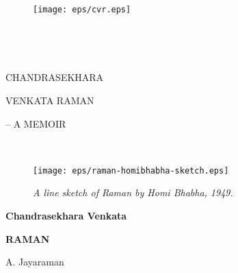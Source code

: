 ~\phantom{-}
\vfill

\thispagestyle{empty}

\begin{figure}[H]
\centering
\texttt{[image: eps/cvr.eps]}
\end{figure}

\vfill\eject

~\phantom{a}
\vfill

\thispagestyle{empty}

\vfill\eject


~\phantom{a}
\vfill

{
\thispagestyle{empty}

\begin{center}
{\LARGE\sf CHANDRASEKHARA}
\bigskip

{\LARGE\sf VENKATA RAMAN}

\bigskip
{\Large\sf -- A MEMOIR}
\end{center}

\vfill\eject

~\phantom{-}
\vfill

\thispagestyle{empty}

\begin{figure}[H]
\centering
\texttt{[image: eps/raman-homibhabha-sketch.eps]}

\medskip
{\fontsize{10pt}{12pt}\selectfont\em A line sketch of Raman by Homi Bhabha, 1949.}\relax
\end{figure}

\vfill\eject


\thispagestyle{empty}

\begin{center}
{\Large\sf\bfseries Chandrasekhara Venkata}

\bigskip

{\fontsize{28}{28}\selectfont\sf\bfseries RAMAN}\relax

\vfill

{\sf\Large A. Jayaraman}

\vfill




\end{center}}

